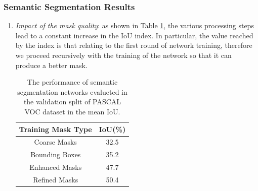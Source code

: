 \subsubsection{Semantic Segmentation Results}
\begin{enumerate}
    \item \emph{Impact of the mask quality}: as shown in Table \ref{IoU}, the various processing 
    steps lead to a constant increase in the IoU index. In particular, 
    the value reached by the index is that relating to the first round of 
    network training, therefore we proceed recursively with the training of 
    the network so that it can produce a better mask.
    \begin{table}[h!]
        \centering
        \begin{adjustbox}{max width=\textwidth}
        \begin{tabular}{|c|c|}
            \hline
            Training Mask Type & IoU(\%)\\
            \hline
            Coarse Masks & 32.5 \\
            Bounding Boxes & 35.2 \\
            Enhanced Masks & 47.7 \\
            Refined Masks & 50.4 \\
            \hline
        \end{tabular}
        \end{adjustbox}
        \caption{The performance of semantic segmentation networks evalueted in the validation split of PASCAL VOC dataset in the mean IoU.}
        \label{IoU}
    \end{table}
    

\end{enumerate}
